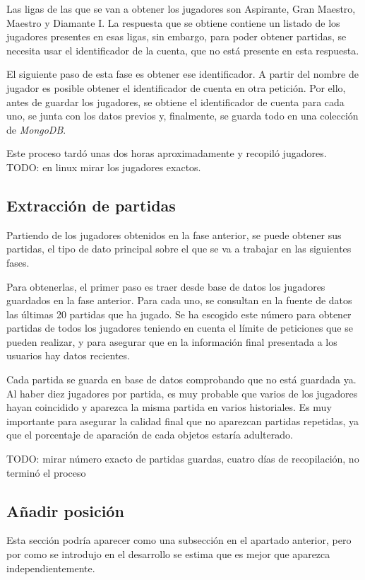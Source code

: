 Las ligas de las que se van a obtener los jugadores son Aspirante, Gran Maestro, Maestro y Diamante I. La respuesta que se obtiene contiene un listado de los jugadores presentes en esas ligas, sin embargo, para poder obtener partidas, se necesita usar el identificador de la cuenta, que no está presente en esta respuesta.

El siguiente paso de esta fase es obtener ese identificador. A partir del nombre de jugador es posible obtener el identificador de cuenta en otra petición. Por ello, antes de guardar los jugadores, se obtiene el identificador de cuenta para cada uno, se junta con los datos previos y, finalmente, se guarda todo en una colección de \textit{MongoDB}.

Este proceso tardó unas dos horas aproximadamente y recopiló  jugadores.
TODO: en linux mirar los jugadores exactos.

\subsection{Extracción de partidas}
Partiendo de los jugadores obtenidos en la fase anterior, se puede obtener sus partidas, el tipo de dato principal sobre el que se va a trabajar en las siguientes fases.

Para obtenerlas, el primer paso es traer desde base de datos los jugadores guardados en la fase anterior. Para cada uno, se consultan en la fuente de datos las últimas 20 partidas que ha jugado. Se ha escogido este número para obtener partidas de todos los jugadores teniendo en cuenta el límite de peticiones que se pueden realizar, y para asegurar que en la información final presentada a los usuarios hay datos recientes.

Cada partida se guarda en base de datos comprobando que no está guardada ya. Al haber diez jugadores por partida, es muy probable que varios de los jugadores hayan coincidido y aparezca la misma partida en varios historiales. Es muy importante para asegurar la calidad final que no aparezcan partidas repetidas, ya que el porcentaje de aparación de cada objetos estaría adulterado.

TODO: mirar número exacto de partidas guardas, cuatro días de recopilación, no terminó el proceso

\subsection{Añadir posición}
Esta sección podría aparecer como una subsección en el apartado anterior, pero por como se introdujo en el desarrollo se estima que es mejor que aparezca independientemente.

